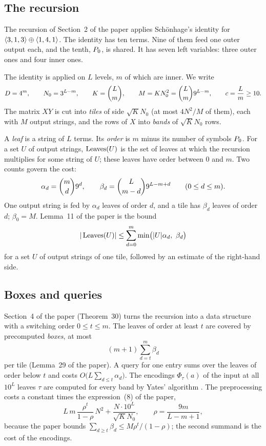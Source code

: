 \subsection{The recursion}
\label{sec:recursion}

The recursion of Section~2 of the paper applies Sch\"onhage's identity
\cite{Sch81} for \(\langle 3,1,3\rangle\oplus\langle 1,4,1\rangle\).  The identity has ten terms.
Nine of them feed one outer output each, and the tenth, \(P_{0}\), is shared.  It
has seven left variables: three outer ones and four inner ones.

The identity is applied on \(L\) levels, \(m\) of which are inner.  We write
\[
  D=4^{m},\qquad N_0=3^{L-m},\qquad K=\binom{L}{m},\qquad
  M=K N_0^{2}=\binom{L}{m} 9^{L-m},\qquad c=\frac Lm\ge 10 .
\]
The matrix \(XY\) is cut into \emph{tiles} of side \(\sqrt K N_0\) (at most
\(4N^2/M\) of them), each with \(M\) output strings, and the rows of \(X\) into
\emph{bands} of \(\sqrt K N_0\) rows.

A \emph{leaf} is a string of \(L\) terms.  Its \emph{order} is \(m\) minus its
number of symbols \(P_{0}\).  For a set \(U\) of output strings, \(\operatorname{Leaves}(U)\)
is the set of leaves at which the recursion multiplies for some string of
\(U\); these leaves have order between \(0\) and \(m\).  Two counts govern the
cost:
\[
  \alpha_d=\binom{m}{d} 9^{d},\qquad
  \beta_d=\binom{L}{m-d}9^{L-m+d}\qquad(0\le d\le m).
\]
One output string is fed by \(\alpha_d\) leaves of order \(d\), and a tile has
\(\beta_d\) leaves of order \(d\); \(\beta_0=M\).  Lemma~11 of the paper is the
bound
\begin{equation}\label{eq:lemma11}
  |\Leaves(U)|\le\sum_{d=0}^{m}\min\bigl(|U|\alpha_d,\ \beta_d\bigr)
\end{equation}
for a set \(U\) of output strings of one tile, followed by an estimate of the
right-hand side.

\subsection{Boxes and queries}
\label{sec:boxes}

Section~4 of the paper (Theorem~30) turns the recursion into a data structure
with a switching order \(0\le t\le m\).  The leaves of order at least \(t\) are
covered by precomputed \emph{boxes}, at most
\begin{equation}\label{eq:boxes}
  (m+1)\sum_{d=t}^{m}\beta_d
\end{equation}
per tile (Lemma~29 of the paper).  A query for one entry sums over the leaves
of order below \(t\) and costs \(O\bigl(L\sum_{d\le t}\alpha_d\bigr)\).  The
encodings \(\Phi_\tau(a)\) of the input at all \(10^{L}\) leaves \(\tau\) are
computed for every band by Yates' algorithm \cite{Yat37}.  The preprocessing
costs a constant times the expression~(8) of the paper,
\begin{equation}\label{eq:cost8}
  L\,m\,\frac{\rho^{t}}{1-\rho}\,N^{2}+\frac{N\cdot 10^{L}}{\sqrt K N_0},
  \qquad \rho=\frac{9m}{L-m+1},
\end{equation}
because the paper bounds \(\sum_{d\ge t}\beta_d\le M\rho^{t}/(1-\rho)\); the
second summand is the cost of the encodings.

